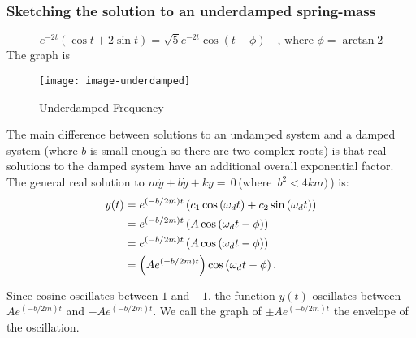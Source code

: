 \subsubsection{Sketching the solution to an underdamped spring-mass}
\begin{equation*}
  \displaystyle  e^{-2t}\left(\cos t+2 \sin t\right) \displaystyle =
  \displaystyle \sqrt{5} e^{-2t} \cos \left(t - \phi \right) \quad
  \text{, where } \phi = \arctan 2
\end{equation*}
The graph is
\begin{figure}[ht!]
  \centering
  \texttt{[image: image-underdamped]}
  \caption{Underdamped Frequency}
\end{figure}

The main difference between solutions to an undamped system and a damped system
(where $b$ is small enough so there are two complex roots) is
that real solutions to the damped system have an additional overall exponential factor.\\

The general real solution to $m\ddot{y}+b\dot{y}+ky=\, 0\,$(where $\, b^2<4km)\,$) is:
\begin{align*}
  \displaystyle  \displaystyle y(t)
  & \displaystyle = \displaystyle  e^{(-b/2m)t}
    \left( c_1\cos \left(\omega _ d t \right)+c_2 \sin \left(\omega _ d t\right)\right) \\
  & \displaystyle = \displaystyle  e^{(-b/2m)t} \left( A \cos \left(\omega _ d t -\phi \right) \right) \\
  & \displaystyle = \displaystyle  e^{(-b/2m)t} \left( A \cos \left(\omega _ d t -\phi \right) \right) \\
  & \displaystyle = \displaystyle  \left(A e^{(-b/2m)t}\right) \cos \left(\omega _ d t -\phi \right).    
\end{align*}

Since cosine oscillates between $1$ and $-1$, the function $y(t)$ oscillates between $A e^{(-b/2m)t}$
and $-A e^{(-b/2m)t}$.
We call the graph of $\pm A e^{(-b/2m)t}$ the {\color{blue}envelope} of the oscillation.

